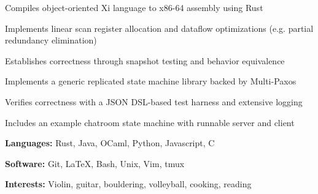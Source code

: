 \documentclass{resume}
\begin{document}
\begin{projects}
	\begin{description}
		\item Compiles object-oriented Xi language to x86-64 assembly using Rust
		\item Implements linear scan register allocation and dataflow optimizations (e.g. partial redundancy elimination)
		\item Establishes correctness through snapshot testing and behavior equivalence
	\end{description}

	\begin{description}
		\item Implements a generic replicated state machine library backed by Multi-Paxos
		\item Verifies correctness with a JSON DSL-based test harness and extensive logging
		\item Includes an example chatroom state machine with runnable server and client
	\end{description}
\end{projects}

\begin{skills}
	\begin{description}
		\item \textbf{Languages:} Rust, Java, OCaml, Python, Javascript, C
		\item \textbf{Software:} Git, LaTeX, Bash, Unix, Vim, tmux
		\item \textbf{Interests:} Violin, guitar, bouldering, volleyball, cooking, reading
	\end{description}
\end{skills}
\end{document}

